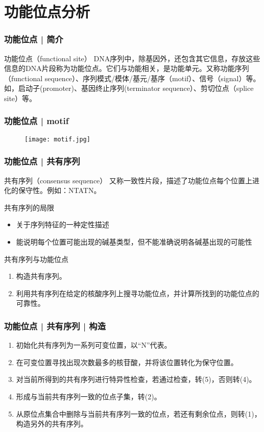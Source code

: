 \section{功能位点分析}
\begin{frame}
  \frametitle{功能位点 | 简介}
  \begin{block}{功能位点（functional site）}
    DNA序列中，除基因外，还包含其它信息，存放这些信息的DNA片段称为功能位点。它们与功能相关，是功能单元。又称功能序列（functional sequence）、序列模式/模体/基元/基序（motif）、信号（signal）等。如，启动子(promoter)、基因终止序列(terminator sequence）、剪切位点（splice site）等。
  \end{block}
\end{frame}

\begin{frame}
  \frametitle{功能位点 | motif}
  \begin{figure}
    \centering
    \texttt{[image: motif.jpg]}
  \end{figure}
\end{frame}

\begin{frame}
  \frametitle{功能位点 | 共有序列}
  \begin{block}{共有序列（consensus sequence）}
    又称一致性片段，描述了功能位点每个位置上进化的保守性。例如：NTATN。
  \end{block}
  \pause
  \begin{block}{共有序列的局限}
    \begin{itemize}
      \item 关于序列特征的一种定性描述
      \item 能说明每个位置可能出现的碱基类型，但不能准确说明各碱基出现的可能性
    \end{itemize}
  \end{block}
  \pause
  \begin{block}{共有序列与功能位点}
    \begin{enumerate}
      \item 构造共有序列。
      \item 利用共有序列在给定的核酸序列上搜寻功能位点，并计算所找到的功能位点的可靠性。
    \end{enumerate}
  \end{block}
\end{frame}

\begin{frame}
  \frametitle{功能位点 | 共有序列 | 构造}
  \begin{enumerate}
    \item 初始化共有序列为一系列可变位置，以“N”代表。
    \item 在可变位置寻找出现次数最多的核苷酸，并将该位置转化为保守位置。
    \item 对当前所得到的共有序列进行特异性检查，若通过检查，转(5)，否则转(4)。
    \item 形成与当前共有序列一致的位点子集，转(2)。
    \item 从原位点集合中删除与当前共有序列一致的位点，若还有剩余位点，则转(1)，构造另外的共有序列。
  \end{enumerate}
\end{frame}

